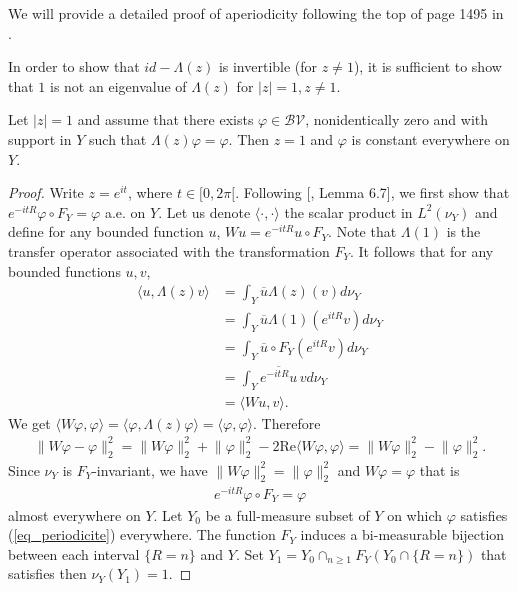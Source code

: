 \documentclass{ws-sd}
\newcommand{\abs}[1]{\left\lvert #1 \right\rvert}
\begin{document}
We will provide a detailed proof of aperiodicity following the top of page 1495 in \cite{15}.

{In order to show that $id-\Lambda(z)$ is invertible (for $z \neq 1$), it is sufficient to show that $1$ is not an eigenvalue of $\Lambda(z)$ for $\abs{z}=1, z \neq 1$. \newline
\begin{lemma}
   Let $\abs{z}=1$ and assume that there exists $\varphi \in \mathcal{BV}$, nonidentically zero  and with support in $Y$ such that $\Lambda(z)\varphi = \varphi$.
   Then $z = 1$ and $\varphi$ is constant everywhere on $Y$.
\end{lemma}

\begin{proof}
Write $z = e^{it}$, where $t \in [0, 2\pi[$. Following [, Lemma 6.7], we first show that $e^{-itR}\varphi \circ F_Y = \varphi$ a.e. on $Y$.
Let us denote $\langle \cdot , \cdot \rangle $ the scalar product in $L^2(\nu_Y)$ and define for any bounded function $u$, $Wu = e^{-itR}u\circ F_Y$. Note that $\Lambda(1)$ is the transfer operator associated with the transformation $F_Y$. It follows that for any bounded functions $u,v$,
\begin{align*}
    \langle u,\Lambda(z)v \rangle
    &= \int_Y \overline{u}\Lambda(z)(v) d\nu_Y \\
    &= \int_Y \overline{u}\Lambda(1)(e^{itR}v) d\nu_Y \\
    &= \int_Y \overline{u}\circ F_Y(e^{itR}v) d\nu_Y \\
    &= \int_Y \overline{e^{-itR}u} \, v d\nu_Y \\
    &= \langle Wu,v \rangle.
\end{align*}
We get $\langle W\varphi,\varphi\rangle = \langle \varphi, \Lambda(z)\varphi \rangle =  \langle \varphi,  \varphi
\rangle$. Therefore
\begin{align*}
    \lVert W\varphi -\varphi\rVert_2^2
    = \lVert W\varphi \rVert_2^2 + \lVert \varphi\rVert_2^2 - 2 \text{Re}\langle W\varphi,\varphi\rangle
    =  \lVert W\varphi \rVert_2^2 -  \lVert \varphi\rVert_2^2.
\end{align*}
 Since $\nu_Y$ is $F_Y$-invariant, we have $\lVert W\varphi \rVert_2^2 =  \lVert \varphi\rVert_2^2$ and $W\varphi = \varphi$ that is
\begin{align}\label{eq_periodicite}
    e^{-itR}\varphi \circ F_Y = \varphi
\end{align}
almost everywhere on $Y$.
Let $Y_0 $ be a full-measure subset of $Y$ on which $\varphi$ satisfies (\ref{eq_periodicite}) everywhere. The function $F_Y$ induces a bi-measurable bijection between each interval $\{R = n \}$ and $Y$. Set $Y_1 = Y_0\cap_{n \ge 1}F_Y(Y_0\cap \{R = n \})$ that satisfies then $\nu_Y(Y_1) = 1$.

\end{proof}}
\end{document}
